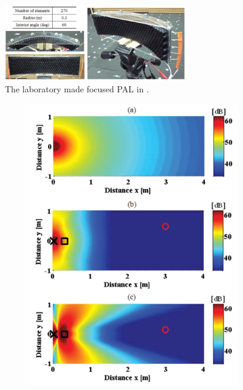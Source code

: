 \begin{figure}[!htb]
    \centering
    \includegraphics[width = 0.7\textwidth]{fig/tanaka2011fig4_resize}
    \caption{The laboratory made focused PAL in \cite{Tanaka2011MathematicallyTrivialControl}.}
    \label{fig:tanaka20112309f}
\end{figure}
\begin{figure}[!htb]
    \centering
    \begin{subfigure}{0.4\textwidth}
        \centering
        \includegraphics[width = \textwidth]{fig/tanaka2011fig3_resize.png}
    \end{subfigure}

\end{figure}
